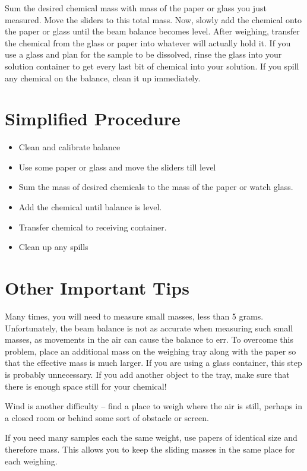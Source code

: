 Sum the desired chemical mass with mass of the paper or glass you just measured. Move the sliders to this total mass. Now, slowly add the chemical onto the paper or glass until the beam balance becomes level. After weighing, transfer the chemical from the glass or paper into whatever will actually hold it. If you use a glass and plan for the sample to be dissolved, rinse the glass into your solution container to get every last bit of chemical into your solution. If you spill any chemical on the balance, clean it up immediately.

\section{Simplified Procedure}

\begin{itemize}

\item{Clean and calibrate balance}
\item{Use some paper or glass and move the sliders till level}
\item{Sum the mass of desired chemicals to the mass of the paper or watch glass.}
\item{Add the chemical until balance is level.}
\item{Transfer chemical to receiving container.}
\item{Clean up any spills}

\end{itemize}

\section{Other Important Tips}

Many times, you will need to measure small masses, less than 5 grams. Unfortunately, the beam balance is not as accurate when measuring such small masses, as movements in the air can cause the balance to err. To overcome this problem, place an additional mass on the weighing tray along with the paper so that the effective mass is much larger. If you are using a glass container, this step is probably unnecessary. If you add another object to the tray, make sure that there is enough space still for your chemical!

Wind is another difficulty – find a place to weigh where the air is still, perhaps in a closed room or behind some sort of obstacle or screen.

If you need many samples each the same weight, use papers of identical size and therefore mass. This allows you to keep the sliding masses in the same place for each weighing.

